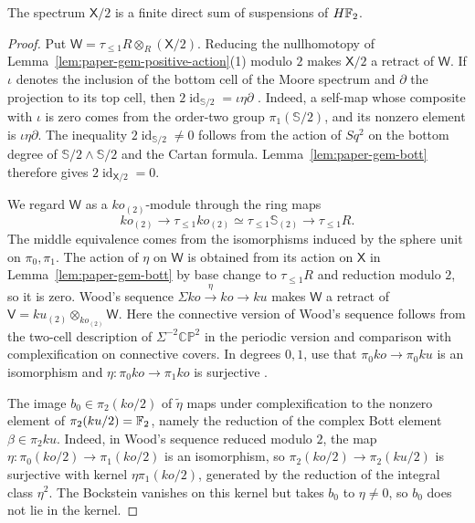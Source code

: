 \begin{lemma}\label{lem:paper-gem-mod-two}
The spectrum $\mathsf{X}/2$ is a finite direct sum of suspensions of $H\mathbb F_2$.
\end{lemma}
\begin{proof}
Put $\mathsf{W}=\tau_{\le1}R\otimes_R(\mathsf{X}/2)$.
Reducing the nullhomotopy of Lemma~\ref{lem:paper-gem-positive-action}(1) modulo $2$ makes $\mathsf{X}/2$ a retract of $\mathsf{W}$.
If $\iota$ denotes the inclusion of the bottom cell of the Moore spectrum and $\partial$ the projection to its top cell, then $2\operatorname{id}_{\mathbb S/2}=\iota\eta\partial$ \cite[Proposition 4]{SchwedeMoore}.
Indeed, a self-map whose composite with $\iota$ is zero comes from the order-two group $\pi_1(\mathbb S/2)$, and its nonzero element is $\iota\eta\partial$.
The inequality $2\operatorname{id}_{\mathbb S/2}\ne0$ follows from the action of $Sq^2$ on the bottom degree of $\mathbb S/2\wedge\mathbb S/2$ and the Cartan formula.
Lemma~\ref{lem:paper-gem-bott} therefore gives $2\operatorname{id}_{\mathsf{X}/2}=0$.

We regard $\mathsf{W}$ as a $ko_{(2)}$-module through the ring maps
\[
 ko_{(2)}\longrightarrow \tau_{\le1}ko_{(2)}
    \simeq \tau_{\le1}\mathbb S_{(2)}\longrightarrow\tau_{\le1}R.
\]
The middle equivalence comes from the isomorphisms induced by the sphere unit on $\pi_0,\pi_1$.
The action of $\eta$ on $\mathsf{W}$ is obtained from its action on $\mathsf{X}$ in Lemma~\ref{lem:paper-gem-bott} by base change to $\tau_{\le1}R$ and reduction modulo $2$, so it is zero.
Wood's sequence $\Sigma ko\xrightarrow{\eta}ko\to ku$ makes $\mathsf{W}$ a retract of $\mathsf{V}=ku_{(2)}\otimes_{ko_{(2)}}\mathsf{W}$.
Here the connective version of Wood's sequence follows from the two-cell description of $\Sigma^{-2}\mathbb{CP}^2$ in the periodic version and comparison with complexification on connective covers.
In degrees $0,1$, use that $\pi_0ko\to\pi_0ku$ is an isomorphism and $\eta:\pi_0ko\to\pi_1ko$ is surjective \cite[Theorem 9.7]{MathewNaumannNoel2017}.

The image $b_0\in\pi_2(ko/2)$ of $\widetilde\eta$ maps under complexification to the nonzero element of $\pi_2(ku/2)=\mathbb F_2$, namely the reduction of the complex Bott element $\beta\in\pi_2ku$.
Indeed, in Wood's sequence reduced modulo $2$, the map $\eta\colon\pi_0(ko/2)\to\pi_1(ko/2)$ is an isomorphism, so $\pi_2(ko/2)\to\pi_2(ku/2)$ is surjective with kernel $\eta\pi_1(ko/2)$, generated by the reduction of the integral class $\eta^2$.
The Bockstein vanishes on this kernel but takes $b_0$ to $\eta\ne0$, so $b_0$ does not lie in the kernel.


\end{proof}
